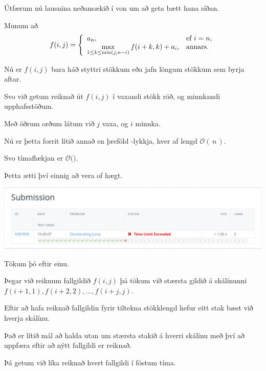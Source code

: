 {
    {
        \item<1-> Útfærum nú lausnina neðansækið í von um að geta bætt hana síðan.
            \item<2-> Munum að
            \[
            f(i, j) = 
                \left \{
                \env{array}
        {
            {l l}
            a_n, & \text{ef $i = n$},\\
                \max\limits_{1 \leq k \leq \min(j, n - i)} f(i + k, k) + a_i, & \text{annars}.
        }
        \right .
            \]
            \item<3-> Nú er $f(i, j)$ bara háð styttri stökkum eða jafn löngum stökkum sem byrja aftar.
            \item<4-> Svo við getum reiknað út $f(i, j)$ í vaxandi stökk röð, og minnkandi upphafsstöðum.
            \item<5-> Með öðrum orðum látum við $j$ vaxa, og $i$ minnka.
    }
}

{
}

{
    {
        \item<1-> Nú er þetta forrit lítið annað en þreföld -lykkja, hver af lengd $\mathcal{O}(\,n\,)$.
            \item<2-> Svo tímaflækjan er $\mathcal{O}($$)$.
            \item<4-> Þetta ætti því einnig að vera of hægt.
            \item<5->[] \includegraphics[scale = 0.25]{fig/tle2.png}
        \item<6-> Tökum þó eftir einu.
    }
}

{
    {
        \item<1-> Þegar við reiknum fallgildið $f(i, j)$ þá tökum við stærsta gildið á skálínunni $f(i + 1, 1), f(i + 2, 2), \dots, f(i + j, j)$.
            \item<2-> Eftir að hafa reiknað fallgildin fyrir tiltekna stökklengd hefur eitt stak bæst við hverja skálínu.
            \item<3-> Það er lítið mál að halda utan um stærsta stakið á hverri skálínu með því að uppfæra eftir að nýtt fallgildi er reiknað.
            \item<4-> Þá getum við líka reiknað hvert fallgildi í föstum tíma.
    }
}

